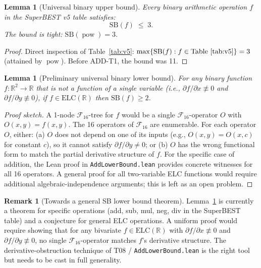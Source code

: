 \documentclass[12pt,a4paper]{article}
\newtheorem{lemma}[theorem]{Lemma}
\theoremstyle{definition}
\newtheorem{remark}[theorem]{Remark}
\newcommand{\powop}{\operatorname{pow}}
\newcommand{\SB}{\mathrm{SB}}
\newcommand{\F}{\mathcal{F}_{16}}
\newcommand{\ELC}{\mathrm{ELC}(\mathbb{R})}
\newcommand{\R}{\mathbb{R}}
\begin{document}
\begin{lemma}[Universal binary upper bound]
\label{lem:universal-upper}
Every binary arithmetic operation $f$ in the SuperBEST v5 table satisfies:
\[
  \SB(f) \;\leq\; 3.
\]
The bound is tight: $\SB(\powop) = 3$.
\end{lemma}

\begin{proof}
Direct inspection of Table~\ref{tab:v5}: $\max\{\SB(f) : f\in\text{Table~\ref{tab:v5}}\} = 3$
(attained by $\powop$).  Before ADD-T1, the bound was 11.
\end{proof}

\begin{lemma}[Preliminary universal binary lower bound]
\label{lem:universal-lower}
For any binary function $f:\R^2\to\R$ that is not a function of a single variable
(i.e., $\partial f/\partial x \not\equiv 0$ and $\partial f/\partial y \not\equiv 0$),
if $f\in\ELC$ then $\SB(f) \geq 2$.
\end{lemma}

\begin{proof}[Proof sketch]
A 1-node $\F$-tree for $f$ would be a single $\F$-operator $O$ with
$O(x,y)=f(x,y)$.  The 16 operators of $\F$ are enumerable.  For each
operator $O$, either:
(a) $O$ does not depend on one of its inputs (e.g., $O(x,y)=O(x,c)$ for
constant $c$), so it cannot satisfy $\partial f/\partial y \neq 0$; or
(b) $O$ has the wrong functional form to match the partial derivative structure of $f$.
For the specific case of addition, the Lean proof in \texttt{AddLowerBound.lean}
provides concrete witnesses for all 16 operators.
A general proof for all two-variable ELC functions would require additional
algebraic-independence arguments; this is left as an open problem.
\end{proof}

\begin{remark}[Towards a general SB lower bound theorem]
Lemma~\ref{lem:universal-lower} is currently a theorem for specific operations
(add, sub, mul, neg, div in the SuperBEST table) and a conjecture for general
ELC operations.  A uniform proof would require showing that for any bivariate
$f\in\ELC$ with $\partial f/\partial x \not\equiv 0$ and $\partial f/\partial y\not\equiv 0$,
no single $\F$-operator matches $f$'s derivative structure.  The derivative-obstruction
technique of T08 / \texttt{AddLowerBound.lean} is the right tool but needs to be
cast in full generality.
\end{remark}
\end{document}
